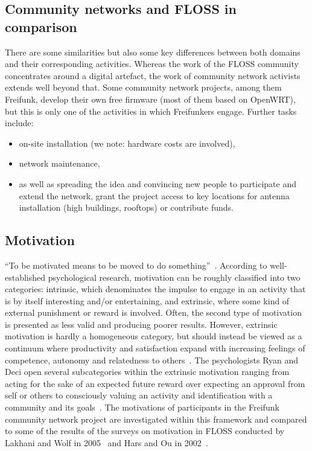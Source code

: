 \subsection{Community networks and FLOSS in comparison}\label{subsec:comparison}
There are some similarities but also some key differences between both domains and their corresponding activities. %
Whereas the work of the FLOSS community concentrates around a digital artefact, the work of community network activists extends well beyond that.
Some community network projects, among them Freifunk, develop their own free firmware (most of them based on OpenWRT), but this is only one of the activities in which Freifunkers engage.
Further tasks include:
\begin{itemize}
  \item on-site installation (we note: hardware costs are involved),
  \item network maintenance,
  \item as well as spreading the idea and convincing new people to participate and extend the network, grant the project access to key locations for antenna installation (high buildings, rooftops) or contribute funds. %
\end{itemize}

\subsection{Motivation}\label{subsec:motivation}
``To be motivated means to be moved to do something''~\cite{RyDe2000}.
According to well-established psychological research, motivation can be roughly classified into two categories:
intrinsic, which denominates the impulse to engage in an activity that is by itself interesting and/or entertaining,
and extrinsic, where some kind of external punishment or reward is involved.
Often, the second type of motivation is presented as less valid and producing poorer results. %
However, extrinsic motivation is hardly a homogeneous category, but should instead be viewed as a continuum where productivity and satisfaction expand with increasing feelings of competence, autonomy and relatedness to others~\cite{RyDe2000}.
The psychologists Ryan and Deci open several subcategories within the extrinsic motivation ranging from acting for the sake of an expected future reward over expecting an approval from self or others to consciously valuing an activity and identification with a community and its goals~\cite{RyDe2000}.
The motivations of participants in the Freifunk community network project are investigated within this framework and compared to some of the results of the surveys on motivation in FLOSS conducted by Lakhani and Wolf in 2005~\cite{LakWo2005} and Hars and Ou in 2002~\cite{HarOu2002}.

